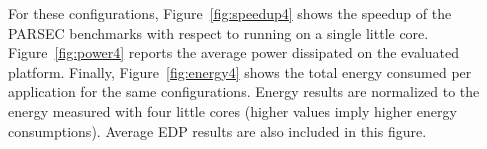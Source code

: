 For these configurations, Figure~\ref{fig:speedup4} shows the speedup of the PARSEC benchmarks with respect to running on a single little core. Figure~\ref{fig:power4} reports the average power dissipated on the evaluated platform. Finally, Figure~\ref{fig:energy4} shows the total energy consumed per application for the same configurations. Energy results are normalized to the energy measured with four little cores (higher values imply higher energy consumptions). Average EDP results are also included in this figure.

